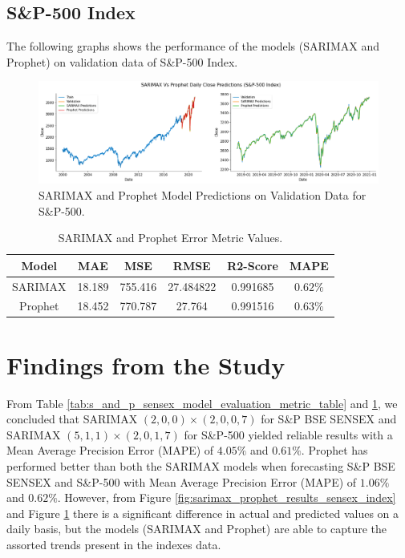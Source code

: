 \documentclass[conference]{IEEEtran}
\begin{document}
\subsection{S\&P-500 Index}
The following graphs shows the performance of the models (SARIMAX and Prophet) on validation data of S\&P-500 Index.

\begin{figure}[htbp]
	\centering
	\includegraphics[width = \textwidth]{images/SARIMAX-Prophet-S&P-500-Predictions.png}
	\caption{SARIMAX and Prophet Model Predictions on Validation Data for S\&P-500.}
	\label{fig: sarimax_prophet_results_for_s_and_p_500_index}
\end{figure}

\begin{table}[htbp]
	\setlength{\tabcolsep}{20pt}
	\renewcommand{\arraystretch}{1.5}
	\centering
	\caption{SARIMAX and Prophet Error Metric Values.}
	\begin{tabular}{|c | c | c | c | c | c |}
	\hline
	\textbf{Model} & \textbf{MAE} & \textbf{MSE} & \textbf{RMSE} & \textbf{R2-Score} & \textbf{MAPE} \\
	\hline
	SARIMAX        & 18.189       & 755.416      & 27.484822     & 0.991685          & $0.62 \%$     \\
	\hline
	Prophet        & 18.452       & 770.787      & 27.764        & 0.991516          & $0.63\%$      \\
	\hline
	\end{tabular}
	\label{tab: s_and_p_500_model_evaluation_metric_table}
\end{table}

\twocolumn
\section{Findings from the Study}

From Table \ref{tab:s_and_p_sensex_model_evaluation_metric_table} and \ref{tab: s_and_p_500_model_evaluation_metric_table}, we concluded that SARIMAX $(2, 0, 0) \times (2, 0, 0, 7)$ for S\&P BSE SENSEX and SARIMAX $(5, 1, 1) \times (2, 0, 1, 7)$ for S\&P-500 yielded reliable results with a Mean Average Precision Error (MAPE) of $4.05\%$ and $0.61\%$. Prophet has performed better than both the SARIMAX models when forecasting S\&P BSE SENSEX and S\&P-500 with Mean Average Precision Error (MAPE) of $1.06\%$ and $0.62\%$. \newline
However, from Figure \ref{fig:sarimax_prophet_results_sensex_index} and Figure \ref{fig: sarimax_prophet_results_for_s_and_p_500_index} there is a significant difference in actual and predicted values on a daily basis, but the models (SARIMAX and Prophet) are able to capture the assorted trends present in the indexes data. \newline
\end{document}
